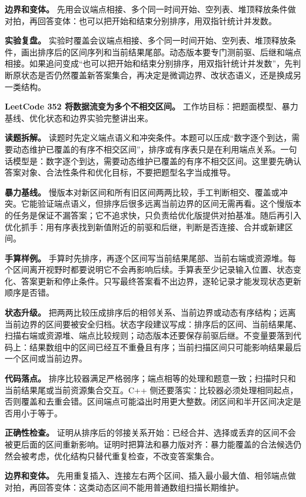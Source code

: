 \textbf{边界和变体。} 先用会议端点相接、多个同一时间开始、空列表、堆顶释放条件做对拍，再回答变体：也可以把开始和结束分别排序，用双指针统计并发数。

\textbf{实验复盘。} 实验时覆盖会议端点相接、多个同一时间开始、空列表、堆顶释放条件，画出排序后的区间序列和当前结果尾部。动态版本要专门测前驱、后继和端点相接。如果追问变成“也可以把开始和结束分别排序，用双指针统计并发数”，先判断原状态是否仍然覆盖新答案集合，再决定是微调边界、改状态语义，还是换成另一类结构。

\noindent\textbf{LeetCode 352 将数据流变为多个不相交区间。} 工作坊目标：把题面模型、暴力基线、优化状态和边界实验完整讲出来。

\textbf{读题拆解。} 读题时先定义端点语义和冲突条件。本题可以压成“数字逐个到达，需要动态维护已覆盖的有序不相交区间”，排序或有序表只是在利用端点关系。一句话模型是：数字逐个到达，需要动态维护已覆盖的有序不相交区间。这里要先确认答案对象、合法性条件和优化目标，不要把题型名字当成推导。

\textbf{暴力基线。} 慢版本对新区间和所有旧区间两两比较，手工判断相交、覆盖或冲突。它能验证端点语义，但排序后很多远离当前边界的区间无需再看。这个慢版本的任务是保证不漏答案；它不追求快，只负责给优化版提供对拍基准。随后再引入优化抓手：用有序表找到新值附近的前驱和后继，判断是否连接、合并或新建区间。

\textbf{手算样例。} 手算时先排序，再逐个区间写当前结果尾部、当前右端或资源堆。每个区间离开视野时都要说明它不会再影响后续。手算表至少记录输入位置、状态变化、答案更新和停止条件。只写最终答案看不出边界，逐轮记录才能发现状态更新顺序是否错。

\textbf{状态升级。} 把两两比较压成排序后的相邻关系、当前边界或动态有序结构；远离当前边界的区间要被安全归档。状态字段建议写成：排序后的区间、当前结果尾、扫描右端或资源堆、端点比较规则；动态版本还要保存前驱后继。不变量要落到代码上：结果数组中的区间已经互不重叠且有序；当前扫描区间只可能影响结果最后一个区间或当前边界。

\textbf{代码落点。} 排序比较器满足严格弱序；端点相等的处理和题意一致；扫描时只和当前结果尾或当前资源集合交互。C++ 侧还要落实：比较器必须处理相同起点，否则覆盖和去重会错。区间端点可能溢出时用更大整数。闭区间和半开区间决定是否用小于等于。

\textbf{正确性检查。} 证明从排序后的邻接关系开始：已经合并、选择或丢弃的区间不会被更后面的区间重新影响。证明时把算法和暴力版对齐：暴力能覆盖的合法候选仍然会被考虑，优化结构只替代重复检查，不改变答案集合。

\textbf{边界和变体。} 先用重复插入、连接左右两个区间、插入最小最大值、相邻端点做对拍，再回答变体：这类动态区间不能用普通数组扫描长期维护。

